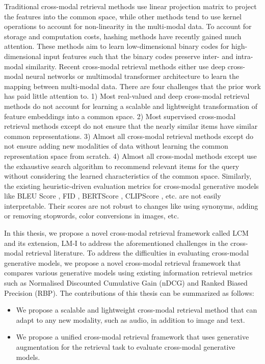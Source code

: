 \par Traditional cross-modal retrieval methods \cite{ocmfh, lsrh} use linear projection matrix to project the features into the common space, while other methods tend to use kernel operations \cite{srlch, dch} to account for non-linearity in the multi-modal data. To account for storage and computation costs, hashing methods have recently gained much attention. These methods aim to learn low-dimensional binary codes for high-dimensional input features such that the binary codes preserve inter- and intra-modal similarity. Recent cross-modal retrieval methods either use deep cross-modal neural networks \cite{dsmhn,acmr,sdml,dvsh} or multimodal transformer architecture \cite{BLIP, VILT} to learn the mapping between multi-modal data. There are four challenges that the prior work has paid little attention to. 1) Most real-valued and deep cross-modal retrieval methods do not account for learning a scalable and lightweight transformation of feature embeddings into a common space. 2) Most supervised cross-modal retrieval methods except \cite{ssah,svhn} do not ensure that the nearly similar items have similar common representations. 3) Almost all cross-modal retrieval methods except \cite{sdml, svhn, joint} do not ensure adding new modalities of data without learning the common representation space from scratch. 4) Almost all cross-modal methods except \cite{jgrhml,cdpae} use the exhaustive search algorithm to recommend relevant items for the query without considering the learned characteristics of the common space. Similarly, the existing heuristic-driven evaluation metrics for cross-modal generative models like BLEU Score \cite{bleu}, FID \cite{FID}, BERTScore \cite{BERTScore}, CLIPScore \cite{CLIPScore}, etc. are not easily interpretable. Their scores are not robust to changes like using synonyms, adding or removing stopwords, color conversions in images, etc. 

In this thesis, we propose a novel cross-modal retrieval framework called LCM and its extension, LM-I to address the aforementioned challenges in the cross-modal retrieval literature. To address the difficulties in evaluating cross-modal generative models, we propose a novel cross-modal retrieval framework that compares various generative models using existing information retrieval metrics such as Normalised Discounted Cumulative Gain (nDCG\textquotesingle@K) and Ranked Biased Precision (RBP\textquotesingle@K). The contributions of this thesis can be summarized as follows:
\begin{itemize}
    \item We propose a scalable and lightweight cross-modal retrieval method that can adapt to any new modality, such as audio, in addition to image and text.
    \item We propose a unified cross-modal retrieval framework that uses generative augmentation for the retrieval task to evaluate cross-modal generative models.
\end{itemize}

